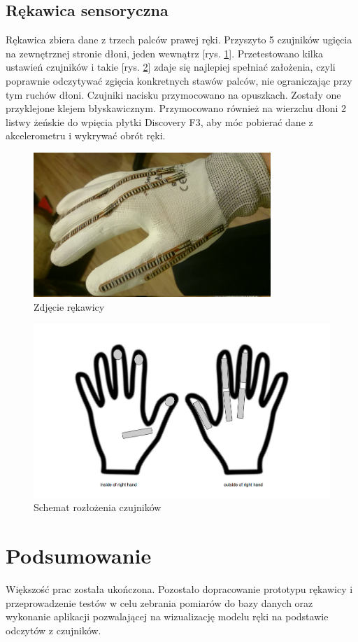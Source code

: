 \documentclass[12pt,a4paper]{article}
\begin{document}
\subsection{Rękawica sensoryczna}
Rękawica zbiera dane z trzech palców prawej ręki. Przyszyto 5 czujników ugięcia na zewnętrznej stronie dłoni, jeden wewnątrz [rys.  \ref{fig:rekawica2}]. Przetestowano kilka ustawień czujników i takie [rys.  \ref{fig:rekawica}] zdaje się najlepiej spełniać założenia, czyli poprawnie odczytywać zgięcia konkretnych stawów palców, nie ograniczając przy tym ruchów dłoni. Czujniki nacisku przymocowano na opuszkach. Zostały one przyklejone klejem błyskawicznym. Przymocowano również na wierzchu dłoni 2 listwy żeńskie do wpięcia płytki Discovery F3, aby móc pobierać dane z akcelerometru i wykrywać obrót ręki.
\begin{figure}[h]
\centering
\includegraphics[width=0.8\textwidth]{./rekawica2.jpg}
\caption{Zdjęcie rękawicy}
\label{fig:rekawica2}
\end{figure}
\begin{figure}[h]
\centering
\includegraphics[width=1\textwidth]{./rekawica.jpg}
\caption{Schemat rozłożenia czujników}
\label{fig:rekawica}
\end{figure}

\section{Podsumowanie}
Większość prac została ukończona. Pozostało dopracowanie prototypu rękawicy i przeprowadzenie testów w celu zebrania pomiarów do bazy danych oraz wykonanie aplikacji pozwalającej na wizualizację modelu ręki na podstawie odczytów z czujników.
\end{document}

